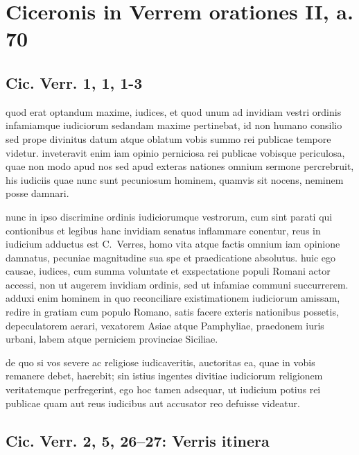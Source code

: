 
\section*{Ciceronis in Verrem orationes II, a. 70}

\subsection*{Cic. Verr. 1, 1, 1-3}

quod erat optandum maxime, iudices, et quod unum ad invidiam vestri ordinis infamiamque iudiciorum sedandam maxime pertinebat, id non humano consilio sed prope divinitus datum atque oblatum vobis summo rei publicae tempore videtur. inveteravit enim iam opinio perniciosa rei publicae vobisque periculosa, quae non modo apud nos sed apud exteras nationes omnium sermone percrebruit, his iudiciis quae nunc sunt pecuniosum hominem, quamvis sit nocens, neminem posse damnari.

nunc in ipso discrimine ordinis iudiciorumque vestrorum, cum sint parati qui contionibus et legibus hanc invidiam senatus inflammare conentur, reus in iudicium adductus est C.~Verres, homo vita atque factis omnium iam opinione damnatus, pecuniae magnitudine sua spe et praedicatione absolutus. huic ego causae, iudices, cum summa voluntate et exspectatione populi Romani actor accessi, non ut augerem invidiam ordinis, sed ut infamiae communi succurrerem. adduxi enim hominem in quo reconciliare existimationem iudiciorum amissam, redire in gratiam cum populo Romano, satis facere exteris nationibus possetis, depeculatorem aerari, vexatorem Asiae atque Pamphyliae, praedonem iuris urbani, labem atque perniciem provinciae Siciliae.

de quo si vos severe ac religiose iudicaveritis, auctoritas ea, quae in vobis remanere debet, haerebit; sin istius ingentes divitiae iudiciorum religionem veritatemque perfregerint, ego hoc tamen adsequar, ut iudicium potius rei publicae quam aut reus iudicibus aut accusator reo defuisse videatur.

\subsection*{Cic. Verr. 2, 5, 26–27: Verris itinera}




